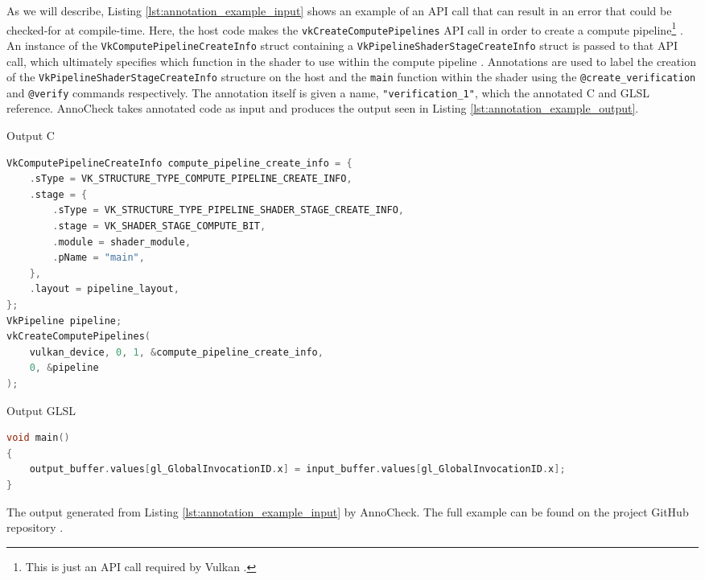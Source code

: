 \documentclass[a4paper,12pt,twoside,openright]{report}
\begin{document}
As we will describe, Listing \ref{lst:annotation_example_input} shows an
example of an API call that can result in an error that could be checked-for at
compile-time. Here, the host code makes the \texttt{vkCreateComputePipelines}
API call in order to create a compute pipeline\footnote{This is just an API
call required by Vulkan \cite{vkCreateComputePipelines}.}
\cite{vkCreateComputePipelines}. An instance of the
\texttt{VkComputePipelineCreateInfo} struct containing a
\texttt{VkPipelineShaderStageCreateInfo} struct is passed to that API call,
which ultimately specifies which function in the shader to use within the
compute pipeline \cite{VkComputePipelineCreateInfo}
\cite{VkPipelineShaderStageCreateInfo}. Annotations are used to label the
creation of the \texttt{VkPipelineShaderStageCreateInfo} structure on the host
and the \texttt{main} function within the shader using the
\texttt{@create\_verification} and \texttt{@verify} commands respectively. The
annotation itself is given a name, \texttt{"verification\_1"}, which the
annotated C and GLSL reference. AnnoCheck takes annotated code as input and
produces the output seen in Listing \ref{lst:annotation_example_output}.

\begin{lstfloat}
\begin{center} Output C \end{center}
\begin{lstlisting}[language=C]
VkComputePipelineCreateInfo compute_pipeline_create_info = {
    .sType = VK_STRUCTURE_TYPE_COMPUTE_PIPELINE_CREATE_INFO,
    .stage = {
        .sType = VK_STRUCTURE_TYPE_PIPELINE_SHADER_STAGE_CREATE_INFO,
        .stage = VK_SHADER_STAGE_COMPUTE_BIT,
        .module = shader_module,
        .pName = "main",
    },
    .layout = pipeline_layout,
};
VkPipeline pipeline;
vkCreateComputePipelines(
    vulkan_device, 0, 1, &compute_pipeline_create_info,
    0, &pipeline
);
\end{lstlisting}
\begin{center} Output GLSL \end{center}
\begin{lstlisting}[language=C]
void main()
{
    output_buffer.values[gl_GlobalInvocationID.x] = input_buffer.values[gl_GlobalInvocationID.x];
}
\end{lstlisting}
\caption{The output generated from Listing \ref{lst:annotation_example_input}
by AnnoCheck. The full example can be found on the project GitHub repository
\cite{ProjectSource}.}
\label{lst:annotation_example_output}
\end{lstfloat}
\end{document}
